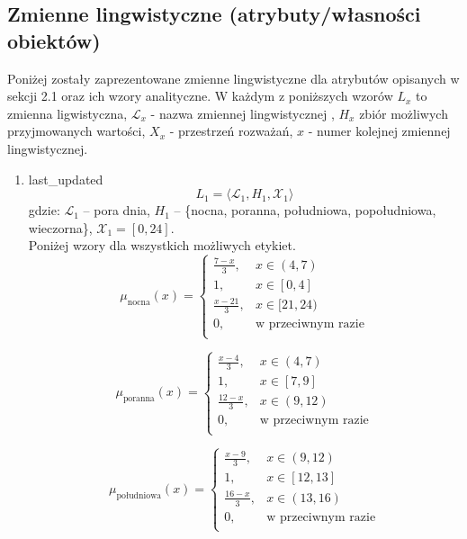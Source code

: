 \documentclass{article}
\begin{document}
\subsection{Zmienne lingwistyczne (atrybuty/własności obiektów)}
Poniżej zostały zaprezentowane zmienne lingwistyczne dla atrybutów opisanych w sekcji 2.1 oraz ich wzory analityczne. W każdym z poniższych wzorów \(L_x\) to zmienna ligwistyczna, $\mathcal{L}_x$ - nazwa zmiennej lingwistycznej , \(H_x\) zbiór możliwych przyjmowanych wartości, \(X_x\) - przestrzeń rozważań, \(x\) - numer kolejnej zmiennej lingwistycznej. 
\begin{enumerate}
    \item last\_updated
        \begin{equation}
            L_1 = \langle \mathcal{L}_1, H_1, \mathcal{X}_1 \rangle
        \end{equation}
        gdzie: $\mathcal{L}_1$ – pora dnia, $H_1$ – \{nocna, poranna, południowa, popołudniowa, wieczorna\}, $\mathcal{X}_1 = [0, 24]$. \\
        Poniżej wzory dla wszystkich możliwych etykiet.
        \begin{equation}
            \mu_{\text{nocna}}(x) =
            \begin{cases}
            \frac{7 - x}{3}, & x \in (4, 7) \\
            1, & x \in [0, 4] \\
            \frac{x - 21}{3}, & x \in [21, 24) \\
            0, & \text{w przeciwnym razie} \\
            \end{cases}
        \end{equation}

        \begin{equation}
            \mu_{\text{poranna}}(x) =
            \begin{cases}
            \frac{x - 4}{3}, & x \in (4, 7) \\
            1, & x \in [7, 9] \\
            \frac{12 - x}{3}, & x \in (9, 12) \\
            0, & \text{w przeciwnym razie} \\
            \end{cases}
        \end{equation}

        \begin{equation}
            \mu_{\text{południowa}}(x) =
            \begin{cases}
            \frac{x - 9}{3}, & x \in (9, 12) \\
            1, & x \in [12, 13] \\
            \frac{16 - x}{3}, & x \in (13, 16) \\
            0, & \text{w przeciwnym razie} \\
            \end{cases}
        \end{equation}


\end{enumerate}
\end{document}
